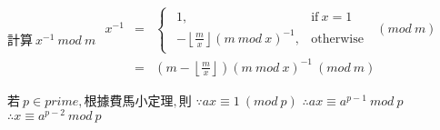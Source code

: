 \begin{itemize}
    $計算 \ x^{-1} \ mod \ m$
    $\begin{array}{rcl}
        x^{-1} & = & \begin{cases} \begin{array}{cl}
                        1, & \text{if} \ x=1 \\
                        -\left \lfloor\frac{m}{x} \right\rfloor(m \ mod \ x)^{-1}, & \text{otherwise}
                     \end{array} \end{cases} \ (mod \ m) \\
               & = & (m-\left \lfloor\frac{m}{x} \right\rfloor)(m \ mod \ x)^{-1} \ (mod \ m)
     \end{array}$
 
    $若 \ p \in prime, 根據費馬小定理, 則$
    $\because ax \equiv 1 \ (mod \ p)$
    $\therefore ax \equiv a^{p-1} \ mod \ p$
    $\therefore x \equiv a^{p-2} \ mod \ p$ 
    
\end{itemize}